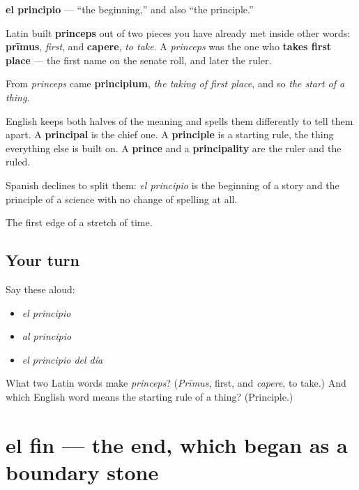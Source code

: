 \begin{cousinweb}
\textbf{el principio} — \textquotedblleft{}the beginning,\textquotedblright{} and also \textquotedblleft{}the principle.\textquotedblright{}

Latin built \textbf{princeps} out of two pieces you have already met inside other words: \textbf{prīmus}, \emph{first}, and \textbf{capere}, \emph{to take}. A \emph{princeps} was the one who \textbf{takes first place} — the first name on the senate roll, and later the ruler.

From \emph{princeps} came \textbf{principium}, \emph{the taking of first place}, and so \emph{the start of a thing}.

English keeps both halves of the meaning and spells them differently to tell them apart. A \textbf{principal} is the chief one. A \textbf{principle} is a starting rule, the thing everything else is built on. A \textbf{prince} and a \textbf{principality} are the ruler and the ruled.

Spanish declines to split them: \emph{el principio} is the beginning of a story and the principle of a science with no change of spelling at all.
\end{cousinweb}

\begin{grammarlens}[title={What you've built}]
The first edge of a stretch of time.
\end{grammarlens}

\subsection*{Your turn}
Say these aloud:

\begin{itemize}
\raggedright
  \item \emph{el principio}
  \item \emph{al principio}
  \item \emph{el principio del día}
\end{itemize}

\begin{tcolorbox}[breakable,colback=teal!4,colframe=teal!35!black,title={Before you move on}]
What two Latin words make \emph{princeps}? (\emph{Prīmus}, first, and \emph{capere}, to take.) And which English word means the starting rule of a thing? (Principle.)
\end{tcolorbox}
\section[el fin]{el fin — the end, which began as a boundary stone}


